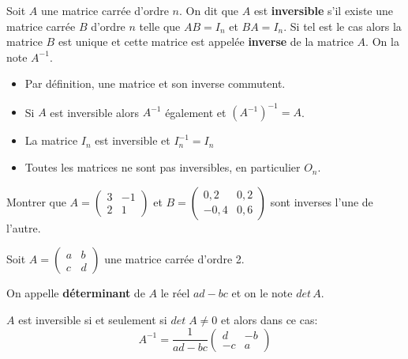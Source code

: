 \documentclass[a4paper]{article}
\begin{document}
\begin{theoreme}{}{}
	Soit $A$ une matrice carrée d'ordre $n$. On dit que $A$ est \textbf{inversible} s'il existe une matrice carrée $B$ d'ordre $n$ telle que $AB=I_n$ et $BA=I_n$. Si tel est le cas alors la matrice $B$ est unique et cette matrice est appelée \textbf{inverse} de la matrice $A$. On la note $A^{-1}$.
\end{theoreme}

\begin{remark}{}{}

\begin{itemize}[label=\textbullet]
	\item Par définition, une matrice et son inverse commutent.
	\item Si $A$ est inversible alors $A^{-1}$ également et $(A^{-1})^{-1}=A$.
	\item La matrice $I_n$ est inversible et $I_n^{-1}=I_n$
	\item Toutes les matrices ne sont pas inversibles, en particulier $O_n$.
\end{itemize}
	
\end{remark}


\bigskip

\begin{exercice}{}{}
	 Montrer que $A=\begin{pmatrix}
3 & -1 \\
2 & 1
\end{pmatrix}$ et $B=\begin{pmatrix}
0,2 & 0,2 \\
-0,4 & 0,6
\end{pmatrix}$ sont inverses l'une de l'autre.

\end{exercice}

\begin{definition}{}{}
	Soit $A=\begin{pmatrix}
a & b \\
c & d
\end{pmatrix}$ une matrice carrée d'ordre 2.

On appelle \textbf{déterminant} de $A$ le réel  $ad-bc$ et on le note $det \, A$.
\end{definition}

\begin{propriete}{}{}
	$A$ est inversible si et seulement si $det \; A \neq 0$ et alors dans ce cas:
$$A^{-1}=\dfrac{1}{ad-bc}\begin{pmatrix}
d & -b \\
-c & a
\end{pmatrix}$$
\end{propriete}
\end{document}
